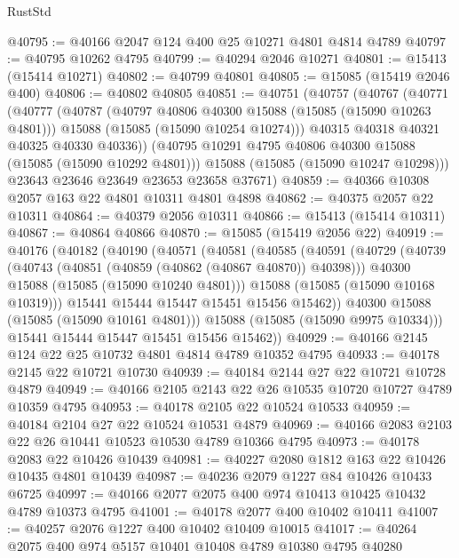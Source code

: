 \begin{lexlean}{RustStd}
\begin{coremodule}
@40795 := @40166 @2047 @124 @400 @25 @10271 @4801 @4814 @4789
@40797 := @40795 @10262 @4795
@40799 := @40294 @2046 @10271
@40801 := @15413 (@15414 @10271)
@40802 := @40799 @40801
@40805 := @15085 (@15419 @2046 @400)
@40806 := @40802 @40805
@40851 := @40751
    (@40757
      (@40767
        (@40771
          (@40777
            (@40787
              (@40797 @40806 @40300 @15088 (@15085 (@15090 @10263 @4801)))
              @15088
              (@15085 (@15090 @10254 @10274)))
            @40315
            @40318
            @40321
            @40325
            @40330
            @40336))
        (@40795 @10291 @4795 @40806 @40300 @15088 (@15085 (@15090 @10292 @4801)))
        @15088
        (@15085 (@15090 @10247 @10298)))
      @23643
      @23646
      @23649
      @23653
      @23658
      @37671)
@40859 := @40366 @10308 @2057 @163 @22 @4801 @10311 @4801 @4898
@40862 := @40375 @2057 @22 @10311
@40864 := @40379 @2056 @10311
@40866 := @15413 (@15414 @10311)
@40867 := @40864 @40866
@40870 := @15085 (@15419 @2056 @22)
@40919 := @40176
    (@40182
      (@40190
        (@40571
          (@40581
            (@40585
              (@40591
                (@40729
                  (@40739
                    (@40743 (@40851 (@40859 (@40862 (@40867 @40870)) @40398)))
                    @40300
                    @15088
                    (@15085 (@15090 @10240 @4801)))
                  @15088
                  (@15085 (@15090 @10168 @10319)))
                @15441
                @15444
                @15447
                @15451
                @15456
                @15462))
            @40300
            @15088
            (@15085 (@15090 @10161 @4801)))
          @15088
          (@15085 (@15090 @9975 @10334)))
        @15441
        @15444
        @15447
        @15451
        @15456
        @15462))
@40929 := @40166 @2145 @124 @22 @25 @10732 @4801 @4814 @4789 @10352 @4795
@40933 := @40178 @2145 @22 @10721 @10730
@40939 := @40184 @2144 @27 @22 @10721 @10728 @4879
@40949 := @40166 @2105 @2143 @22 @26 @10535 @10720 @10727 @4789 @10359 @4795
@40953 := @40178 @2105 @22 @10524 @10533
@40959 := @40184 @2104 @27 @22 @10524 @10531 @4879
@40969 := @40166 @2083 @2103 @22 @26 @10441 @10523 @10530 @4789 @10366 @4795
@40973 := @40178 @2083 @22 @10426 @10439
@40981 := @40227 @2080 @1812 @163 @22 @10426 @10435 @4801 @10439
@40987 := @40236 @2079 @1227 @84 @10426 @10433 @6725
@40997 := @40166 @2077 @2075 @400 @974 @10413 @10425 @10432 @4789 @10373 @4795
@41001 := @40178 @2077 @400 @10402 @10411
@41007 := @40257 @2076 @1227 @400 @10402 @10409 @10015
@41017 := @40264 @2075 @400 @974 @5157 @10401 @10408 @4789 @10380 @4795 @40280

\end{coremodule}
\end{lexlean}
